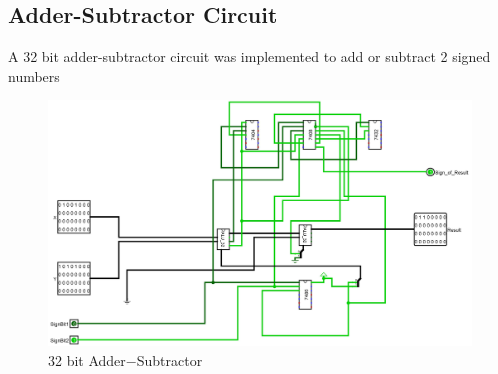 \documentclass[12pt]{article}
\begin{document}
\subsection{Adder-Subtractor Circuit}
A 32 bit adder-subtractor circuit was implemented to add or subtract 2 signed numbers
\begin{figure}[H]
    \centering
        \includegraphics[width=\textwidth]{images/Adder_Subtractor.jpg}
        \caption{32 bit Adder$-$Subtractor}
        \label{fig:32bitaddsub}
\end{figure}

\newpage
\end{document}

